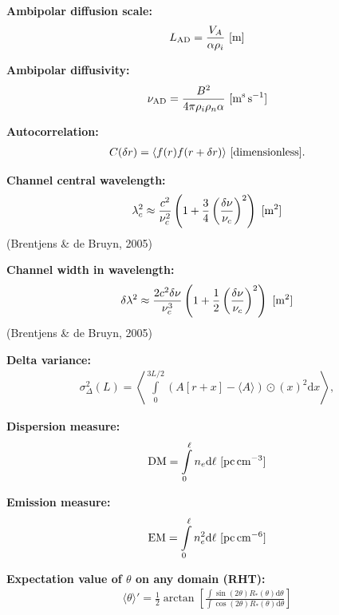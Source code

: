 \documentclass[a4paper,11pt]{article}
\begin{document}
{\noindent}\textbf{Ambipolar diffusion scale:}
\begin{align*}
    L_\mathrm{AD} = \dfrac{V_A}{\alpha\rho_i} ~ [\rm m]
\end{align*}

{\noindent}\textbf{Ambipolar diffusivity:}
\begin{align*}
    \nu_\mathrm{AD} = \dfrac{B^2}{4\pi\rho_i\rho_n\alpha} ~ [{\rm m^s\,s^{-1}}]
\end{align*}

{\noindent}\textbf{Autocorrelation:}
\begin{align*}
    C(\delta r) = \langle f(r)f(r+\delta r)\rangle ~ [{\rm dimensionless}].
\end{align*}

{\noindent}\textbf{Channel central wavelength:} 
\begin{align*}
\lambda_c^2 \approx \dfrac{c^2}{\nu_c^2} \left(1+\dfrac{3}{4}\left(\dfrac{\delta\nu}{\nu_c}\right)^2\right) ~ [{\rm m^2}]
\end{align*}
(Brentjens \& de Bruyn, 2005)

{\noindent}\textbf{Channel width in wavelength:} 
\begin{align*}
\delta\lambda^2 \approx \dfrac{2c^2\delta\nu}{\nu_c^3} \left(1+\dfrac{1}{2}\left(\dfrac{\delta\nu}{\nu_c}\right)^2\right) ~ [{\rm m^2}]
\end{align*}
(Brentjens \& de Bruyn, 2005)

{\noindent}\textbf{Delta variance:}
\begin{align*}
    \sigma_\Delta^2(L) = \left\langle \int\limits_0^{3L/2} {(A[r+x]-\langle A\rangle)\odot(x)}^2\mathrm{d}x \right\rangle,
\end{align*}

{\noindent}\textbf{Dispersion measure:}
\begin{align*}
    {\rm DM} = \int\limits_0^\ell n_e\mathrm{d}\ell ~ [{\rm pc\,cm^{-3}}]
\end{align*}

{\noindent}\textbf{Emission measure:}
\begin{align*}
    {\rm EM} = \int\limits_0^\ell n_e^2\mathrm{d}\ell ~ [{\rm pc\,cm^{-6}}]
\end{align*}

{\noindent}\textbf{Expectation value of $\theta$ on any domain (RHT):}
\begin{align*}
    \langle\theta\rangle' = \frac{1}{2}\arctan \left[\frac{\int\sin(2\theta)R_*(\theta)\mathrm{d}\theta}{\int\cos(2\theta)R_*(\theta)\mathrm{d}\theta}\right]
\end{align*}
\end{document}
